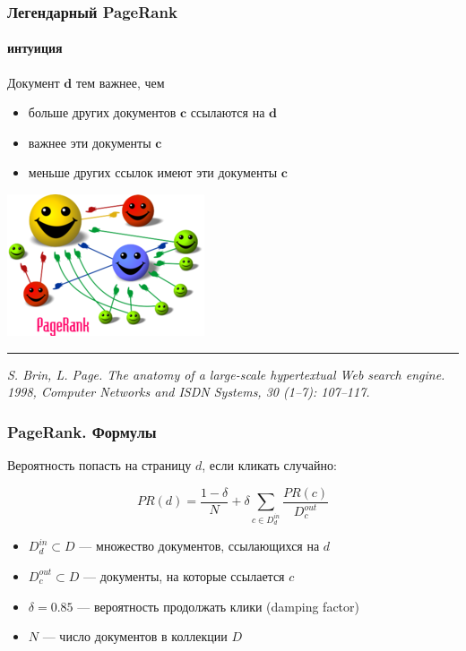 \documentclass[fullscreen=true, bookmarks=true, hyperref={pdfencoding=unicode}]{beamer}
\begin{document}
\begin{frame}
  \frametitle{Легендарный PageRank}
  \framesubtitle{интуиция}

  Документ $\mathbf{d}$ тем важнее, чем
  \begin{itemize}
    \item больше других документов $\mathbf{c}$ ссылаются на $\mathbf{d}$
    \item важнее эти документы $\mathbf{c}$
    \item меньше других ссылок имеют эти документы $\mathbf{c}$
  \end{itemize}

  \begin{center}
    \includegraphics[keepaspectratio,
                     width=.4\paperwidth]{220px-PageRank-hi-res.png}
  \end{center}

  \noindent\rule{8cm}{0.4pt}

  {\it S. Brin, L. Page. The anatomy of a large-scale hypertextual Web search engine. 1998, Computer Networks and ISDN Systems, 30 (1–7): 107–117.}
\end{frame}


\begin{frame}
  \frametitle{PageRank. Формулы}

  Вероятность попасть на страницу $d$, если кликать случайно:

  $$ PR(d) = \frac{1-\delta}{N} + \delta \sum\limits_{c\in D_d^{in}}\frac{PR(c)}{D_c^{out}} $$

  \begin{itemize}
    \item $D_d^{in} \subset D$ — множество документов, ссылающихся на $d$
    \item $D_c^{out} \subset D$ — документы, на которые ссылается $c$
    \item $\delta = 0.85$ — вероятность продолжать клики (damping factor)
    \item $N$ — число документов в коллекции $D$
  \end{itemize}
\end{frame}
\end{document}
